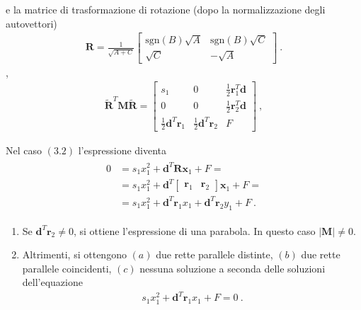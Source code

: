 \documentclass[letterpaper,10pt,italian]{jupyterBook}
\begin{document}
\sphinxAtStartPar
e la matrice di trasformazione di rotazione (dopo la normalizzazione degli autovettori)
\begin{equation*}
\begin{split}\mathbf{R} = \frac{1}{\sqrt{A+C}}\begin{bmatrix} \text{sgn}(B) \sqrt{A} & \text{sgn}(B) \sqrt{C} \\ \sqrt{C} & - \sqrt{A} \end{bmatrix} \ .\end{split}
\end{equation*}
\sphinxAtStartPar
{} ,
\begin{equation*}
\begin{split}\widetilde{\mathbf{R}}^T \mathbf{M} \widetilde{\mathbf{R}} = \begin{bmatrix} s_1 & 0 & \frac{1}{2} \mathbf{r}_1^T \mathbf{d} \\ 0 & 0 & \frac{1}{2} \mathbf{r}_2^T \mathbf{d} \\ \frac{1}{2} \mathbf{d}^T \mathbf{r}_1 & \frac{1}{2} \mathbf{d}^T \mathbf{r}_2 & F \end{bmatrix} \ ,\end{split}
\end{equation*}
\sphinxAtStartPar
{}

\sphinxAtStartPar
Nel caso \((3.2)\) l’espressione diventa
\begin{equation*}
\begin{split}\begin{aligned}
  0 
  & = s_1 x_1^2 + \mathbf{d}^T \mathbf{R} \mathbf{x}_1 + F = \\
  & = s_1 x_1^2 + \mathbf{d}^T \begin{bmatrix} \mathbf{r}_1 & \mathbf{r}_2 \end{bmatrix} \mathbf{x}_1 + F = \\
  & = s_1 x_1^2 + \mathbf{d}^T \mathbf{r}_1 x_1 + \mathbf{d}^T \mathbf{r}_2 y_1 + F \ .
\end{aligned}\end{split}
\end{equation*}\begin{enumerate}
%
\item {} 
\sphinxAtStartPar
Se \(\mathbf{d}^T \mathbf{r}_2 \ne 0\), si ottiene l’espressione di una parabola. In questo caso \(|\mathbf{M}| \ne 0\).

\item {} 
\sphinxAtStartPar
Altrimenti, si ottengono \((a)\) due rette parallele distinte, \((b)\) due rette parallele coincidenti, \((c)\) nessuna soluzione a seconda delle soluzioni dell’equazione
\begin{equation*}
\begin{split}s_1 x_1^2 + \mathbf{d}^T \mathbf{r}_1 x_1 + F = 0 \ .\end{split}
\end{equation*}
\end{enumerate}
\end{document}
